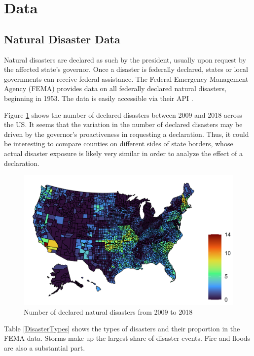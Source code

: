 
\section{Data} \label{Data}

\subsection{Natural Disaster Data}

Natural disasters are declared as such by the president, usually upon request by the affected state's governor. Once a disaster is federally declared, states or local governments can receive federal assistance. The Federal Emergency Management Agency (FEMA) provides data on all federally declared natural disasters, beginning in 1953. The data is easily accessible via their API \citep{rfema}.

Figure \ref{DisasterMap} shows the number of declared disasters between 2009 and 2018 across the US. It seems that the variation in the number of declared disasters may be driven by the governor's proactiveness in requesting a declaration. Thus, it could be interesting to compare counties on different sides of state borders, whose actual disaster exposure is likely very similar in order to analyze the effect of a declaration.


\begin{figure}[!h]
	\centering
	\includegraphics[scale=1]{"../Code & Data/DisasterMap.png"}
	\caption{Number of declared natural disasters from 2009 to 2018}
	\label{DisasterMap}
\end{figure}

Table \ref{DisasterTypes} shows the types of disasters and their proportion in the FEMA data. Storms make up the largest share of disaster events. Fire and floods are also a substantial part.

